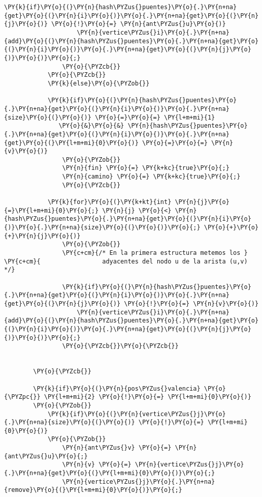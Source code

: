 \begin{Verbatim}[commandchars=\\\{\}]
				    \PY{k}{if}\PY{o}{(}\PY{n}{hash\PYZus{}puentes}\PY{o}{.}\PY{n+na}{get}\PY{o}{(}\PY{n}{i}\PY{o}{)}\PY{o}{.}\PY{n+na}{get}\PY{o}{(}\PY{n}{j}\PY{o}{)} \PY{o}{!}\PY{o}{=} \PY{n}{ant\PYZus{}u}\PY{o}{)}
					\PY{n}{vertice\PYZus{}i}\PY{o}{.}\PY{n+na}{add}\PY{o}{(}\PY{n}{hash\PYZus{}puentes}\PY{o}{.}\PY{n+na}{get}\PY{o}{(}\PY{n}{i}\PY{o}{)}\PY{o}{.}\PY{n+na}{get}\PY{o}{(}\PY{n}{j}\PY{o}{)}\PY{o}{)}\PY{o}{;}
				\PY{o}{\PYZcb{}}
			\PY{o}{\PYZcb{}}
		    \PY{k}{else}\PY{o}{\PYZob{}}

			\PY{k}{if}\PY{o}{(}\PY{n}{hash\PYZus{}puentes}\PY{o}{.}\PY{n+na}{get}\PY{o}{(}\PY{n}{i}\PY{o}{)}\PY{o}{.}\PY{n+na}{size}\PY{o}{(}\PY{o}{)} \PY{o}{=}\PY{o}{=} \PY{l+m+mi}{1} 
			   \PY{o}{&}\PY{o}{&} \PY{n}{hash\PYZus{}puentes}\PY{o}{.}\PY{n+na}{get}\PY{o}{(}\PY{n}{i}\PY{o}{)}\PY{o}{.}\PY{n+na}{get}\PY{o}{(}\PY{l+m+mi}{0}\PY{o}{)} \PY{o}{=}\PY{o}{=} \PY{n}{v}\PY{o}{)}
			    \PY{o}{\PYZob{}}
				\PY{n}{fin} \PY{o}{=} \PY{k+kc}{true}\PY{o}{;}
				\PY{n}{camino} \PY{o}{=} \PY{k+kc}{true}\PY{o}{;}
			    \PY{o}{\PYZcb{}}

			\PY{k}{for}\PY{o}{(}\PY{k+kt}{int} \PY{n}{j}\PY{o}{=}\PY{l+m+mi}{0}\PY{o}{;} \PY{n}{j} \PY{o}{<} \PY{n}{hash\PYZus{}puentes}\PY{o}{.}\PY{n+na}{get}\PY{o}{(}\PY{n}{i}\PY{o}{)}\PY{o}{.}\PY{n+na}{size}\PY{o}{(}\PY{o}{)}\PY{o}{;} \PY{o}{+}\PY{o}{+}\PY{n}{j}\PY{o}{)}
			    \PY{o}{\PYZob{}}
				\PY{c+cm}{/* En la primera estructura metemos los }
\PY{c+cm}{				   adyacentes del nodo u de la arista (u,v) */}
	
				\PY{k}{if}\PY{o}{(}\PY{n}{hash\PYZus{}puentes}\PY{o}{.}\PY{n+na}{get}\PY{o}{(}\PY{n}{i}\PY{o}{)}\PY{o}{.}\PY{n+na}{get}\PY{o}{(}\PY{n}{j}\PY{o}{)} \PY{o}{!}\PY{o}{=} \PY{n}{v}\PY{o}{)}
				    \PY{n}{vertice\PYZus{}i}\PY{o}{.}\PY{n+na}{add}\PY{o}{(}\PY{n}{hash\PYZus{}puentes}\PY{o}{.}\PY{n+na}{get}\PY{o}{(}\PY{n}{i}\PY{o}{)}\PY{o}{.}\PY{n+na}{get}\PY{o}{(}\PY{n}{j}\PY{o}{)}\PY{o}{)}\PY{o}{;}
			    \PY{o}{\PYZcb{}}\PY{o}{\PYZcb{}}


		\PY{o}{\PYZcb{}}

	    \PY{k}{if}\PY{o}{(}\PY{n}{pos\PYZus{}valencia} \PY{o}{\PYZpc{}} \PY{l+m+mi}{2} \PY{o}{!}\PY{o}{=} \PY{l+m+mi}{0}\PY{o}{)}
		\PY{o}{\PYZob{}}
		    \PY{k}{if}\PY{o}{(}\PY{n}{vertice\PYZus{}j}\PY{o}{.}\PY{n+na}{size}\PY{o}{(}\PY{o}{)} \PY{o}{!}\PY{o}{=} \PY{l+m+mi}{0}\PY{o}{)}
			\PY{o}{\PYZob{}}
			    \PY{n}{ant\PYZus{}v} \PY{o}{=} \PY{n}{ant\PYZus{}u}\PY{o}{;}
			    \PY{n}{v} \PY{o}{=} \PY{n}{vertice\PYZus{}j}\PY{o}{.}\PY{n+na}{get}\PY{o}{(}\PY{l+m+mi}{0}\PY{o}{)}\PY{o}{;}
			    \PY{n}{vertice\PYZus{}j}\PY{o}{.}\PY{n+na}{remove}\PY{o}{(}\PY{l+m+mi}{0}\PY{o}{)}\PY{o}{;}
				

\end{Verbatim}
